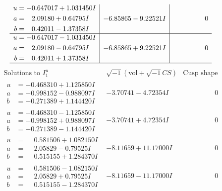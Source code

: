 \documentclass[1p]{elsarticle_modified}
\theoremstyle{definition}
\newcommand{\I}{\sqrt{-1}}
\begin{document}
$$\begin{array}{c|c|c}
\begin{aligned}
u &= -0.647017 + 1.031450 I \\
a &= \phantom{-}2.09180 + 0.64795 I \\
b &= \phantom{-}0.42011 - 1.37358 I\end{aligned}
 & -6.85865 - 9.22521 I & \phantom{-0.000000 } 0 \\ \hline\begin{aligned}
u &= -0.647017 - 1.031450 I \\
a &= \phantom{-}2.09180 - 0.64795 I \\
b &= \phantom{-}0.42011 + 1.37358 I\end{aligned}
 & -6.85865 + 9.22521 I & \phantom{-0.000000 } 0\\
 \hline 
 \end{array}$$\newpage$$\begin{array}{c|c|c}  
\text{Solutions to }I^u_{1}& \I (\text{vol} + \sqrt{-1}CS) & \text{Cusp shape}\\
 \hline 
\begin{aligned}
u &= -0.468310 + 1.125850 I \\
a &= -0.998152 - 0.988097 I \\
b &= -0.271389 + 1.144420 I\end{aligned}
 & -3.70741 - 4.72354 I & \phantom{-0.000000 } 0 \\ \hline\begin{aligned}
u &= -0.468310 - 1.125850 I \\
a &= -0.998152 + 0.988097 I \\
b &= -0.271389 - 1.144420 I\end{aligned}
 & -3.70741 + 4.72354 I & \phantom{-0.000000 } 0 \\ \hline\begin{aligned}
u &= \phantom{-}0.581506 + 1.082150 I \\
a &= \phantom{-}2.05829 - 0.79525 I \\
b &= \phantom{-}0.515155 + 1.284370 I\end{aligned}
 & -8.11659 + 11.17000 I & \phantom{-0.000000 } 0 \\ \hline\begin{aligned}
u &= \phantom{-}0.581506 - 1.082150 I \\
a &= \phantom{-}2.05829 + 0.79525 I \\
b &= \phantom{-}0.515155 - 1.284370 I\end{aligned}
 & -8.11659 - 11.17000 I & \phantom{-0.000000 } 0 \\ \hline\begin{aligned}

\end{aligned}
\end{array}$$
\end{document}

